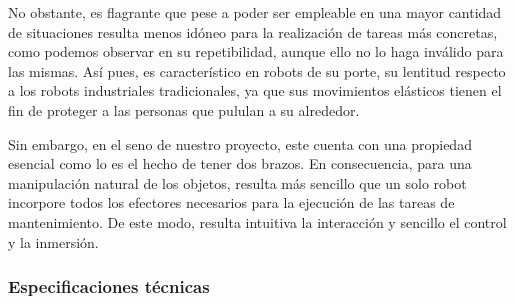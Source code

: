 No obstante, es flagrante que pese a poder ser empleable en una mayor cantidad de situaciones resulta menos idóneo para la realización de tareas más concretas, como podemos observar en su repetibilidad, aunque ello no lo haga inválido para las mismas. Así pues, es característico en robots de su porte, su lentitud respecto a los robots industriales tradicionales, ya que sus movimientos elásticos tienen el fin de proteger a las personas que pululan a su alrededor. 

Sin embargo, en el seno de nuestro proyecto, este cuenta con una propiedad esencial como lo es el hecho de tener dos brazos. En consecuencia, para una manipulación natural de los objetos, resulta más sencillo que un solo robot incorpore todos los efectores necesarios para la ejecución de las tareas de mantenimiento. De este modo, resulta intuitiva la interacción y sencillo el control y la inmersión.

\subsubsection{Especificaciones técnicas}

